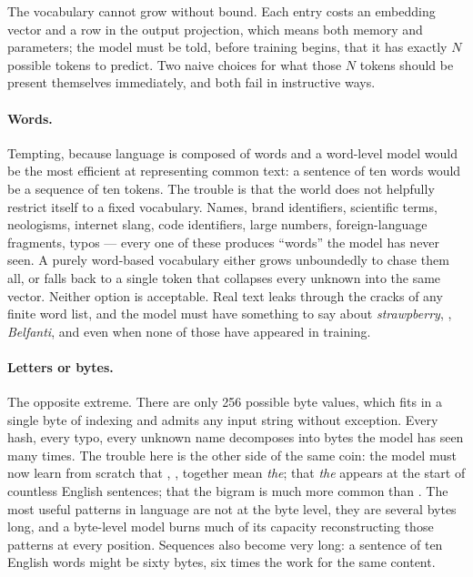 The vocabulary cannot grow without bound. Each entry costs an
embedding vector and a row in the output projection, which means
both memory and parameters; the model must be told, before
training begins, that it has exactly $N$ possible tokens to
predict. Two naive choices for what those $N$ tokens should be
present themselves immediately, and both fail in instructive
ways.

\paragraph{Words.}
Tempting, because language is composed of words and a word-level
model would be the most efficient at representing common text:
a sentence of ten words would be a sequence of ten tokens. The
trouble is that the world does not helpfully restrict itself to
a fixed vocabulary. Names, brand identifiers, scientific terms,
neologisms, internet slang, code identifiers, large numbers,
foreign-language fragments, typos --- every one of these
produces ``words'' the model has never seen. A purely word-based
vocabulary either grows unboundedly to chase them all, or falls
back to a single  token that collapses every unknown
into the same vector. Neither option is acceptable. Real text
leaks through the cracks of any finite word list, and the model
must have something to say about \emph{strawpberry},
, \emph{Belfanti}, and  even when
none of those have appeared in training.

\paragraph{Letters or bytes.}
The opposite extreme. There are only 256 possible byte values,
which fits in a single byte of indexing and admits any input
string without exception. Every hash, every typo, every unknown
name decomposes into bytes the model has seen many times. The
trouble here is the other side of the same coin: the model must
now learn from scratch that , , 
together mean \emph{the}; that \emph{the} appears at the start
of countless English sentences; that the bigram  is
much more common than . The most useful patterns in
language are not at the byte level, they are several bytes long,
and a byte-level model burns much of its capacity reconstructing
those patterns at every position. Sequences also become very
long: a sentence of ten English words might be sixty bytes,
six times the work for the same content.

